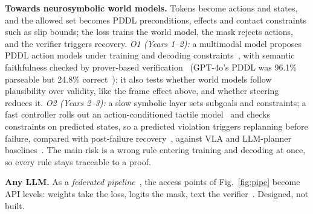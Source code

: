 \documentclass[letterpaper, 10pt, conference]{IEEEtran}
\begin{document}
\textbf{Towards neurosymbolic world models.} Tokens become actions and states, and the allowed set becomes PDDL preconditions, effects and contact constraints such as slip bounds; the loss trains the world model, the mask rejects actions, and the verifier triggers recovery. \emph{O1 (Years 1--2):} a multimodal model proposes PDDL action models under training and decoding constraints~\cite{xu2018,ahmed2023}, with semantic faithfulness checked by prover-based verification~\cite{quan2024,quan2025} (GPT-4o's PDDL was 96.1\% parseable but 24.8\% correct~\cite{planetarium}); it also tests whether world models follow plausibility over validity, like the frame effect above, and whether steering~\cite{valentino2026,kim2025} reduces it. \emph{O2 (Years 2--3):} a slow symbolic layer sets subgoals and constraints; a fast controller rolls out an action-conditioned tactile model~\cite{mandil,nazari2022} and checks constraints on predicted states, so a predicted violation triggers replanning before failure, compared with post-failure recovery~\cite{reflect}, against VLA and LLM-planner baselines~\cite{liberopro,duggan}. The main risk is a wrong rule entering training and decoding at once, so every rule stays traceable to a proof.

\textbf{Any LLM.} As a \emph{federated pipeline}~\cite{sheth2023}, the access points of Fig.~\ref{fig:pipe} become API levels: weights take the loss, logits the mask, text the verifier~\cite{quan2024,quan2025,llmmodulo}. Designed, not built.
\end{document}
